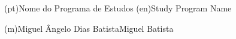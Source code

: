\ntdegreename*(pt){Nome do Programa de Estudos}
\ntdegreename*(en){Study Program Name}




\ntauthorname(m){Miguel Ângelo Dias Batista}{Miguel Batista}

